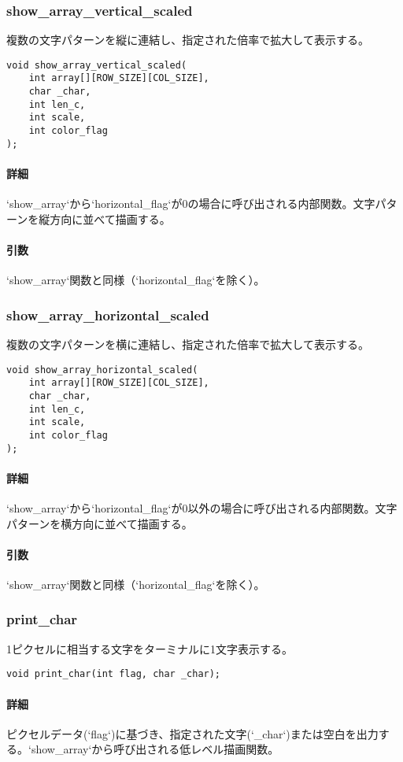 \documentclass[uplatex]{jsarticle}
\begin{document}
\subsubsection{show\_array\_vertical\_scaled}
複数の文字パターンを縦に連結し、指定された倍率で拡大して表示する。
\begin{verbatim}
void show_array_vertical_scaled(
    int array[][ROW_SIZE][COL_SIZE],
    char _char,
    int len_c,
    int scale,
    int color_flag
);
\end{verbatim}
\paragraph{詳細}
`show\_array`から`horizontal\_flag`が0の場合に呼び出される内部関数。文字パターンを縦方向に並べて描画する。
\paragraph{引数}
`show\_array`関数と同様（`horizontal\_flag`を除く）。

\subsubsection{show\_array\_horizontal\_scaled}
複数の文字パターンを横に連結し、指定された倍率で拡大して表示する。
\begin{verbatim}
void show_array_horizontal_scaled(
    int array[][ROW_SIZE][COL_SIZE],
    char _char,
    int len_c,
    int scale,
    int color_flag
);
\end{verbatim}
\paragraph{詳細}
`show\_array`から`horizontal\_flag`が0以外の場合に呼び出される内部関数。文字パターンを横方向に並べて描画する。
\paragraph{引数}
`show\_array`関数と同様（`horizontal\_flag`を除く）。

\subsubsection{print\_char}
1ピクセルに相当する文字をターミナルに1文字表示する。
\begin{verbatim}
void print_char(int flag, char _char);
\end{verbatim}
\paragraph{詳細}
ピクセルデータ(`flag`)に基づき、指定された文字(`\_char`)または空白を出力する。`show\_array`から呼び出される低レベル描画関数。
\end{document}
